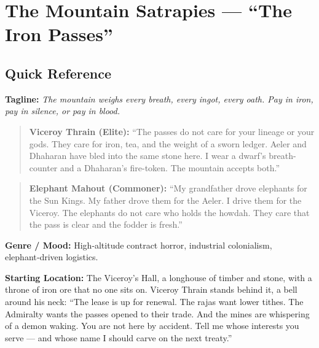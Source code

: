 \section{The Mountain Satrapies --- ``The Iron Passes''}
\label{chap:satrapies}

\subsection*{Quick Reference}
\textbf{Tagline:} \textit{The mountain weighs every breath, every ingot, every oath. Pay in iron, pay in silence, or pay in blood.}

\begin{quote}
  \textbf{Viceroy Thrain (Elite):}  
  ``The passes do not care for your lineage or your gods. They care for iron, tea, and the weight of a sworn ledger. Aeler and Dhaharan have bled into the same stone here. I wear a dwarf's breath-counter and a Dhaharan's fire-token. The mountain accepts both.''
\end{quote}

\begin{quote}
  \textbf{Elephant Mahout (Commoner):}  
  ``My grandfather drove elephants for the Sun Kings. My father drove them for the Aeler. I drive them for the Viceroy. The elephants do not care who holds the howdah. They care that the pass is clear and the fodder is fresh.''
\end{quote}

\textbf{Genre / Mood:} High‑altitude contract horror, industrial colonialism, elephant‑driven logistics.

\textbf{Starting Location:} The Viceroy's Hall, a longhouse of timber and stone, with a throne of iron ore that no one sits on. Viceroy Thrain stands behind it, a bell around his neck: ``The lease is up for renewal. The rajas want lower tithes. The Admiralty wants the passes opened to their trade. And the mines are whispering of a demon waking. You are not here by accident. Tell me whose interests you serve — and whose name I should carve on the next treaty.''

